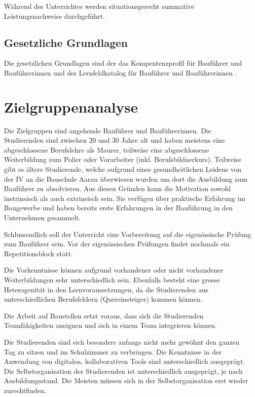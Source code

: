 \documentclass[
11pt,
captions=tableheading,
smallheadings,
headsepline,
footsepline, 
captions=tableheading,
parskip=half-,
]{scrartcl}
\begin{document}
Während des Unterrichtes werden situationsgerecht summative Leistungsnachweise durchgeführt.

\subsection{Gesetzliche Grundlagen}
Die gesetzlichen Grundlagen sind der das Kompentenzprofil für Bauführer und Bauführerinnen \cite{Kompetenzprofil_Baufuehrer} und der Lernfeldkatalog für Bauführer und Bauführerinnen \cite{Lernfeldkatalog_Baufuehrer}.


\section{Zielgruppenanalyse}
\label{sec:Zielgruppenanalyse}
Die Zielgruppen sind angehende Bauführer und Bauführerinnen. Die Studierenden sind zwischen 20 und 30 Jahre alt und haben meistens eine abgeschlossene Berufslehre als Maurer, teilweise eine abgeschlossene Weiterbildung zum Polier oder Vorarbeiter (inkl. Berufsbildnerkurs). 
Teilweise gibt es ältere Studierende, welche aufgrund eines gesundheitlichen Leidens von der IV an die Bauschule Aarau überwiesen wurden um dort die Ausbildung zum Bauführer zu absolvieren.
Aus diesen Gründen kann die Motivation sowohl instrinsisch als auch extrinsisch sein.
Sie verfügen über praktische Erfahrung im Baugewerbe und haben bereits erste Erfahrungen in der Bauführung in den Unternehmen gesammelt.

Schlussendlich soll der Unterricht eine Vorbereitung auf die eigenössische Prüfung zum Bauführer sein. 
Vor der eigenössischen Prüfungen findet nochmals ein Repetitionsblock statt. 

Die Vorkenntnisse können aufgrund vorhandener oder nicht vorhandener Weiterbildungen sehr unterschiedlich sein. 
Ebenfalls besteht eine grosse Heterogenität in den Lernvoraussetzungen, da die Studierenden aus unterschiedlichen Berufsfeldern (Quereinsteiger) kommen können.

Die Arbeit auf Baustellen setzt voraus, dass sich die Studierenden Teamfähigkeiten aneignen und sich in einem Team integrieren können. 

Die Studierenden sind sich besonders anfangs nicht mehr gewöhnt den ganzen Tag zu sitzen und im Schulzimmer zu verbringen. 
Die Kenntnisse in der Anwendung von digitalen, kollaborativen Tools sind unterschiedlich ausgeprägt.
Die Selbstorganisation der Studierenden ist unterschiedlich ausgeprägt, je nach Ausbildungsstand. 
Die Meisten müssen sich in der Selbstorganisation erst wieder zurechtfinden.
\end{document}
